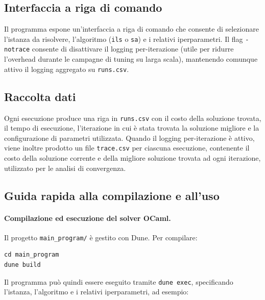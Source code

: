 \documentclass[11pt,a4paper]{article}
\begin{document}
\subsection{Interfaccia a riga di comando}

Il programma espone un'interfaccia a riga di comando che consente di selezionare l'istanza da risolvere, l'algoritmo (\verb|ils| o \verb|sa|) e i relativi iperparametri. Il flag \verb|-notrace| consente di disattivare il logging per-iterazione (utile per ridurre l'overhead durante le campagne di tuning su larga scala), mantenendo comunque attivo il logging aggregato su \verb|runs.csv|.

\subsection{Raccolta dati}

Ogni esecuzione produce una riga in \verb|runs.csv| con il costo della soluzione trovata, il tempo di esecuzione, l'iterazione in cui è stata trovata la soluzione migliore e la configurazione di parametri utilizzata. Quando il logging per-iterazione è attivo, viene inoltre prodotto un file \verb|trace.csv| per ciascuna esecuzione, contenente il costo della soluzione corrente e della migliore soluzione trovata ad ogni iterazione, utilizzato per le analisi di convergenza.

\subsection{Guida rapida alla compilazione e all'uso}
\label{sec:guida-uso}

\paragraph{Compilazione ed esecuzione del solver OCaml.}
Il progetto \texttt{main\_program/} è gestito con Dune. Per compilare:

\begin{verbatim}
cd main_program
dune build
\end{verbatim}

Il programma può quindi essere eseguito tramite \texttt{dune exec}, specificando
l'istanza, l'algoritmo e i relativi iperparametri, ad esempio:
\end{document}
